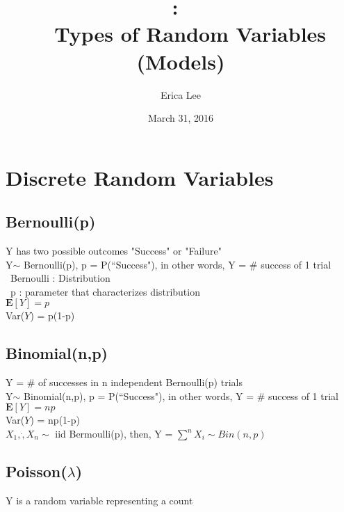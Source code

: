 \documentclass[]{article}
\title{
    \vspace{2in}
    \textmd{\textbf{\hmwkClass:\ \hmwkTitle}}\\
    \vspace{0.1in}\large{\textit{\hmwkClassInstructor\ \hmwkClassTime}}
    \vspace{3in}
}
\author{\textbf{\hmwkAuthorName}}
\date{}
\begin{document}
\title{Types of Random Variables (Models)}
\author{Erica Lee}
\date{March 31, 2016}
\maketitle


\section{Discrete Random Variables}


\subsection*{Bernoulli(p)}
Y has two possible outcomes "Success" or "Failure"\\

Y$\sim$ Bernoulli(p), p = P(``Success"), in other words, Y = \# success of 1 trial\\

\textbullet \ Bernoulli : Distribution\\
\indent \textbullet \ p : parameter that characterizes distribution\\

$\mathbf{E}[Y] = p$\\
\indent Var($Y$) = p(1-p)\\




\subsection*{Binomial(n,p)}
Y = \# of successes in n independent Bernoulli(p) trials\\

Y$\sim$ Binomial(n,p), p = P(``Success"), in other words, Y = \# success of 1 trial\\

$\mathbf{E}[Y] = np$\\
\indent Var($Y$) = np(1-p)\\

$X_1, \dot , X_n \sim$ iid Bermoulli(p), then, Y = $\sum^{n} X_i \sim Bin(n,p)$\\



\subsection*{Poisson($\lambda$)}
Y is a random variable representing a count\\
\end{document}
